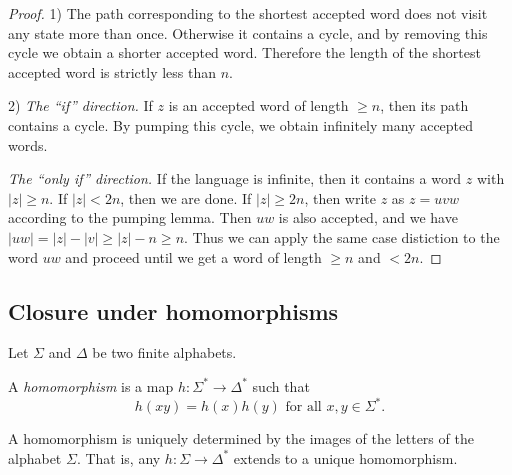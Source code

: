 \begin{page}

\begin{proof}
1) The path corresponding to the shortest accepted word does not visit any state more than once.
Otherwise it contains a cycle, and by removing this cycle we obtain a shorter accepted word.
Therefore the length of the shortest accepted word is strictly less than $n$.

2) \emph{The ``if'' direction.} If $z$ is an accepted word of length $\ge n$, then its path contains a cycle.
By pumping this cycle, we obtain infinitely many accepted words.

\emph{The ``only if'' direction.} If the language is infinite, then it contains a word $z$ with $|z| \ge n$.
If $|z| < 2n$, then we are done.
If $|z| \ge 2n$, then write $z$ as $z = uvw$ according to the pumping lemma.
Then $uw$ is also accepted, and we have $|uw| = |z| - |v| \ge |z| - n \ge n$.
Thus we can apply the same case distiction to the word $uw$ and proceed until we get a word of length $\ge n$ and $< 2n$.
\end{proof}




\end{page}

\begin{page}

\subsection{Closure under homomorphisms}
Let $\Sigma$ and $\Delta$ be two finite alphabets.


\end{page}

\begin{page}

\begin{dfn}
A \emph{homomorphism} is a map $h \colon \Sigma^* \to \Delta^*$ such that
\[
h(xy) = h(x)h(y) \text{ for all }x, y \in \Sigma^*.
\]
\end{dfn}

\end{page}

\begin{page}

\begin{lem}
A homomorphism is uniquely determined by the images of the letters of the alphabet $\Sigma$.
That is, any $h \colon \Sigma \to \Delta^*$ extends to a unique homomorphism.
\end{lem}

\end{page}

